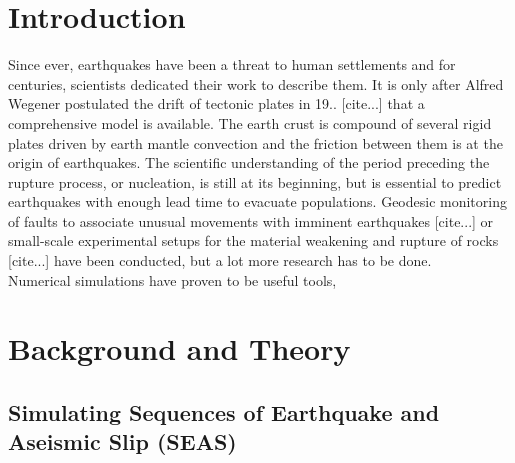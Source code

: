 \chapter{Introduction}
Since ever, earthquakes have been a threat to human settlements and for centuries, scientists dedicated their work to describe them. It is only after Alfred Wegener postulated the drift of tectonic plates in 19.. [cite...] that a comprehensive model is available. The earth crust is compound of several rigid plates driven by earth mantle convection and the friction between them is at the origin of earthquakes. The scientific understanding of the period preceding the rupture process, or nucleation, is still at its beginning, but is essential to predict earthquakes with enough lead time to evacuate populations. Geodesic monitoring of faults to associate unusual movements with imminent earthquakes [cite...] or small-scale experimental setups for the material weakening and rupture of rocks [cite...] have been conducted, but a lot more research has to be done. \\
Numerical simulations have proven to be useful tools, 

\chapter{Background and Theory}
\section{Simulating Sequences of Earthquake and Aseismic Slip (SEAS)}

